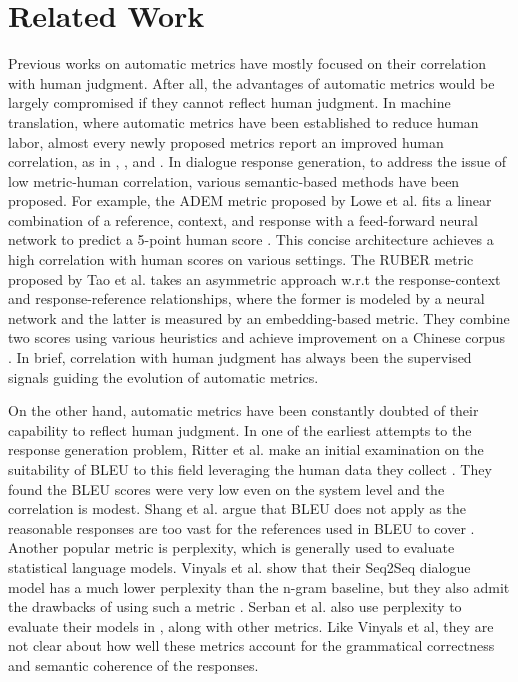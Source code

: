 \documentclass[runningheads]{llncs}
\begin{document}
    \section{Related Work} %
    Previous works on automatic metrics have mostly focused on their correlation with human judgment. After all, the advantages of automatic metrics would be largely compromised if they cannot reflect human judgment. In machine translation, where automatic metrics have been established to reduce human labor, almost every newly proposed metrics report an improved human correlation, as in \cite{NIST}, \cite{METEOR}, and \cite{chrf}. In dialogue response generation, to address the issue of low metric-human correlation, various semantic-based methods have been proposed. For example, the ADEM metric proposed by Lowe et al. fits a linear combination of a reference, context, and response with a feed-forward neural network to predict a 5-point human score \cite{ADEM}. This concise architecture achieves a high correlation with human scores on various settings. The RUBER metric proposed by Tao et al. takes an asymmetric approach w.r.t the response-context and response-reference relationships, where the former is modeled by a neural network and the latter is measured by an embedding-based metric. They combine two scores using various heuristics and achieve improvement on a Chinese corpus \cite{RUBER}. In brief, correlation with human judgment has always been the supervised signals guiding the evolution of automatic metrics.

    On the other hand, automatic metrics have been constantly doubted of their capability to reflect human judgment. In one of the earliest attempts to the response generation problem, Ritter et al. make an initial examination on the suitability of BLEU to this field leveraging the human data they collect \cite{Ritter11}. They found the BLEU scores were very low even on the system level and the correlation is modest. Shang et al. argue that BLEU does not apply as the reasonable responses are too vast for the references used in BLEU to cover \cite{Shang}. Another popular metric is perplexity, which is generally used to evaluate statistical language models. Vinyals et al. show that their Seq2Seq dialogue model has a much lower perplexity than the n-gram baseline, but they also admit the drawbacks of using such a metric \cite{GoogleChatbot}. Serban et al. also use perplexity to evaluate their models in \cite{HRED}, along with other metrics. Like Vinyals et al, they are not clear about how well these metrics account for the grammatical correctness and semantic coherence of the responses.
\end{document}
